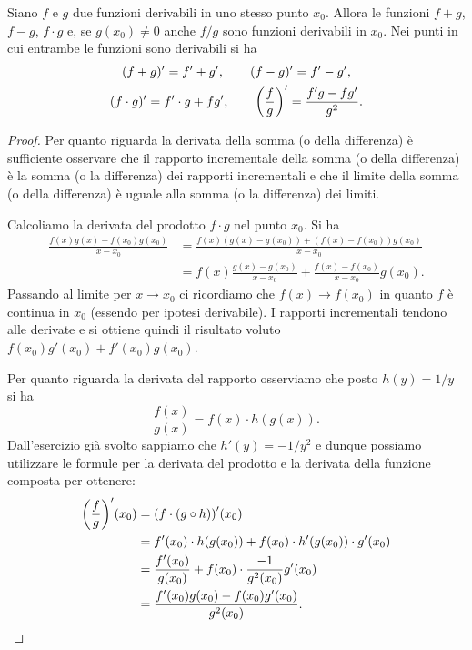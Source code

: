 \begin{theorem}
\mymark{***}
Siano $f$ e $g$ due funzioni derivabili in uno stesso punto $x_0$.
Allora le funzioni $f+g$, $f-g$, $f\cdot g$ e, se $g(x_0)\neq 0$ anche $f/g$ sono funzioni derivabili in $x_0$. Nei punti in cui entrambe le funzioni sono derivabili si ha
\begin{gather*}
  (f+g)' = f' + g', \qquad
  (f-g)' = f' - g', \\
  (f\cdot g)' = f' \cdot g + f g', \qquad
  {\left( \frac{f}{g} \right)}' = \frac{f'g - fg'}{g^2}.
\end{gather*}
\end{theorem}
%
\begin{proof}
\mymark{***}
Per quanto riguarda la derivata della somma (o della differenza) è sufficiente osservare che il rapporto incrementale della somma (o della differenza) è la somma (o la differenza) dei rapporti incrementali e che il limite della somma (o della differenza) è uguale alla somma (o la differenza) dei limiti.

Calcoliamo la derivata del prodotto $f\cdot g$ nel punto $x_0$. Si ha
\begin{align*}
  \frac{f(x)g(x) - f(x_0)g(x_0)}{x-x_0}
  &= \frac{f(x)(g(x) - g(x_0)) + (f(x)-f(x_0))g(x_0)}{x-x_0}\\
  &= f(x) \frac{g(x)-g(x_0)}{x-x_0} + \frac{f(x)-f(x_0)}{x-x_0} g(x_0).
\end{align*}
Passando al limite per $x\to x_0$ ci ricordiamo che $f(x)\to f(x_0)$ in quanto $f$ è continua in $x_0$ (essendo per ipotesi derivabile). I rapporti incrementali tendono alle derivate e si ottiene quindi il risultato voluto $f(x_0) g'(x_0) + f'(x_0) g(x_0)$.

Per quanto riguarda la derivata del rapporto osserviamo che
posto $h(y)=1/y$ si ha
\[
  \frac{f(x)}{g(x)} = f(x) \cdot h(g(x)).
\]
Dall'esercizio già svolto sappiamo che $h'(y) = -1/y^2$ e dunque
possiamo utilizzare le formule per la derivata del prodotto e la derivata della funzione composta per ottenere:
\begin{align*}
  {\left( \frac{f}{g} \right)}'(x_0)
  &= {\left( f \cdot (g\circ h) \right)}'(x_0) \\
  &= f'(x_0) \cdot h(g(x_0)) + f(x_0) \cdot h'(g(x_0))\cdot g'(x_0)\\
  &= \frac{f'(x_0)}{g(x_0)} + f(x_0) \cdot \frac{-1}{g^2(x_0)} g'(x_0)\\
  &= \frac{f'(x_0)g(x_0) - f(x_0)g'(x_0)}{g^2(x_0)}.
\end{align*}
\end{proof}

